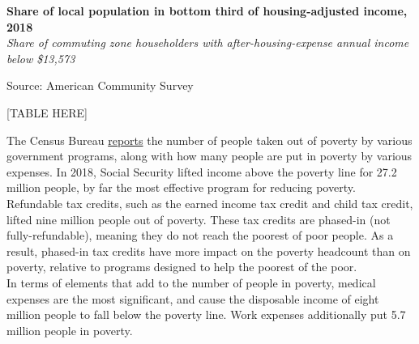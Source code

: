 \documentclass{report}
\begin{document}
{{{\vspace{4mm}

\noindent \normalsize \textbf{Share of local population in bottom third of housing-adjusted income, 2018}\\
\footnotesize{\textit{Share of commuting zone householders with after-housing-expense annual income below \$13,573}}

\vspace{-3mm}
\hspace{-15mm} 

\vspace{-5mm}
\footnotesize{Source: American Community Survey}

\vspace{2mm}

\normalsize

[TABLE HERE]


\newpage

\begin{minipage}{0.76\textwidth}


\small The Census Bureau \href{https://www.census.gov/library/publications/2019/demo/p60-268.html}{reports} the number of people taken out of poverty by various government programs, along with how many people are put in poverty by various expenses. In 2018, Social Security lifted income above the poverty line for 27.2 million people, by far the most effective program for reducing poverty. Refundable tax credits, such as the earned income tax credit and child tax credit, lifted nine million people out of poverty. These tax credits are phased-in (not fully-refundable), meaning they do not reach the poorest of poor people. As a result, phased-in tax credits have more impact on the poverty headcount than on poverty, relative to programs designed to help the poorest of the poor.\\

In terms of elements that add to the number of people in poverty, medical expenses are the most significant, and cause the disposable income of eight million people to fall below the poverty line. Work expenses additionally put 5.7 million people in poverty.\\

\vspace{2mm}


\end{minipage}}}}
\end{document}
